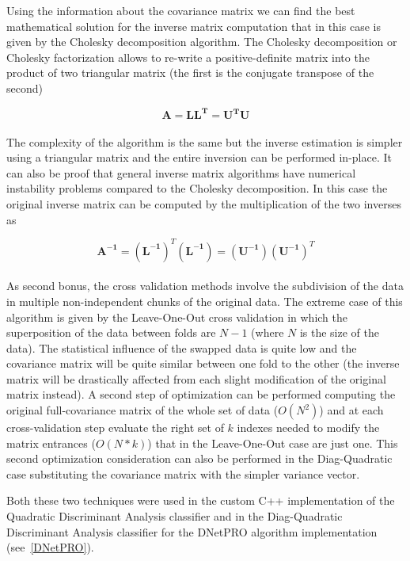 \documentclass{standalone}
\begin{document}
Using the information about the covariance matrix we can find the best mathematical solution for the inverse matrix computation that in this case is given by the Cholesky decomposition algorithm.
The Cholesky decomposition or Cholesky factorization allows to re-write a positive-definite matrix into the product of two triangular matrix (the first is the conjugate transpose of the second)

$$
\mathbf{A} = \mathbf{LL^T} = \mathbf{U^TU}
$$
\\
The complexity of the algorithm is the same but the inverse estimation is simpler using a triangular matrix and the entire inversion can be performed in-place.
It can also be proof that general inverse matrix algorithms have numerical instability problems compared to the Cholesky decomposition.
In this case the original inverse matrix can be computed by the multiplication of the two inverses as

$$
\mathbf{A^{-1}} = (\mathbf{L^{-1}})^T(\mathbf{L^{-1}}) = (\mathbf{U^{-1}})(\mathbf{U^{-1}})^T
$$
\\
As second bonus, the cross validation methods involve the subdivision of the data in multiple non-independent chunks of the original data.
The extreme case of this algorithm is given by the Leave-One-Out cross validation in which the superposition of the data between folds are $N-1$ (where $N$ is the size of the data).
The statistical influence of the swapped data is quite low and the covariance matrix will be quite similar between one fold to the other (the inverse matrix will be drastically affected from each slight modification of the original matrix instead).
A second step of optimization can be performed computing the original full-covariance matrix of the whole set of data ($O(N^2)$) and at each cross-validation step evaluate the right set of $k$ indexes needed to modify the matrix entrances ($O(N*k)$) that in the Leave-One-Out case are just one.
This second optimization consideration can also be performed in the Diag-Quadratic case substituting the covariance matrix with the simpler variance vector.


Both these two techniques were used in the custom C++ implementation of the Quadratic Discriminant Analysis classifier and in the Diag-Quadratic Discriminant Analysis classifier for the DNetPRO algorithm implementation (see~\ref{DNetPRO}).
\end{document}
